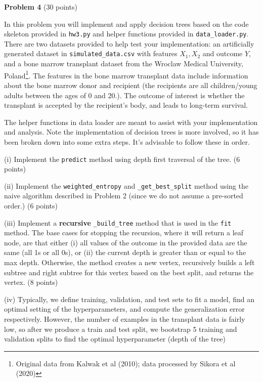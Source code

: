 \documentclass[letterpaper, 11pt]{article}
\begin{document}
{\large\textbf{Problem 4} (30 points)
	
	In this problem you will implement and apply decision trees based on the code skeleton provided in \texttt{hw3.py} and helper functions  provided in \texttt{data\_loader.py}. There are two datasets provided to help test your implementation: an artificially generated dataset in \texttt{simulated\_data.csv} with features $X_1, X_2$ and outcome $Y$, and a bone marrow transplant dataset from the Wroclaw Medical University, Poland\footnote{Original data from Kalwak et al (2010); data processed by Sikora et al (2020)}. The features in the bone marrow transplant  data include  information about the bone marrow donor and recipient (the recipients are all children/young adults between the ages of 0 and 20.). The outcome of interest is whether the transplant is accepted by the recipient's body, and leads to long-term survival.
	
	The helper functions in data loader are meant to assist with your implementation and analysis. Note  the implementation of decision trees is more involved, so it has been broken down into some extra steps. It's advisable to follow these in order.
	
	(i) Implement the \texttt{predict} method using depth first traversal of the tree.  (6 points)
	
	(ii) Implement the \texttt{weighted\_entropy} and \texttt{\_get\_best\_split} method using the naive algorithm described in Problem 2 (since we do not assume a pre-sorted order.) (6 points)
	
	(iii) Implement a \textbf{recursive} \texttt{\_build\_tree} method that is used in the \texttt{fit} method. The base cases for stopping the recursion, where it will return a leaf node, are that either (i) all values of the outcome in the provided data are the same (all 1s or all 0s), or (ii) the current depth is greater than or equal to the max depth. Otherwise, the method creates a new vertex, recursively builds a left subtree and right subtree for this vertex based on the best split, and returns the vertex. (8 points)
	
	(iv) Typically, we define training, validation, and test sets to fit a model, find an optimal setting of the hyperparameters, and compute the generalization error respectively. However, the number of examples in the transplant data is fairly low, so after we produce a train and test split, we bootstrap 5 training and validation splits to find the optimal hyperparameter (depth of the tree) 
	
}
\end{document}
